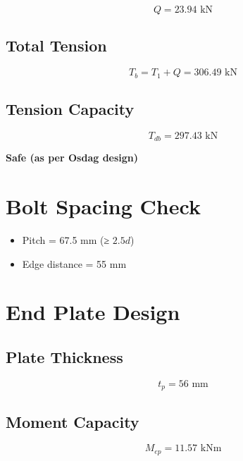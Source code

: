 \begin{equation}
Q = 23.94 \text{ kN}
\end{equation}

\subsection{Total Tension}

\begin{equation}
T_b = T_1 + Q = 306.49 \text{ kN}
\end{equation}

\subsection{Tension Capacity}

\begin{equation}
T_{db} = 297.43 \text{ kN}
\end{equation}

\textbf{Safe (as per Osdag design)}

\section{Bolt Spacing Check}

\begin{itemize}
    \item Pitch = 67.5 mm (≥ $2.5d$)
    \item Edge distance = 55 mm
\end{itemize}

\section{End Plate Design}

\subsection{Plate Thickness}

\begin{equation}
t_p = 56 \text{ mm}
\end{equation}

\subsection{Moment Capacity}

\begin{equation}
M_{ep} = 11.57 \text{ kNm}
\end{equation}

